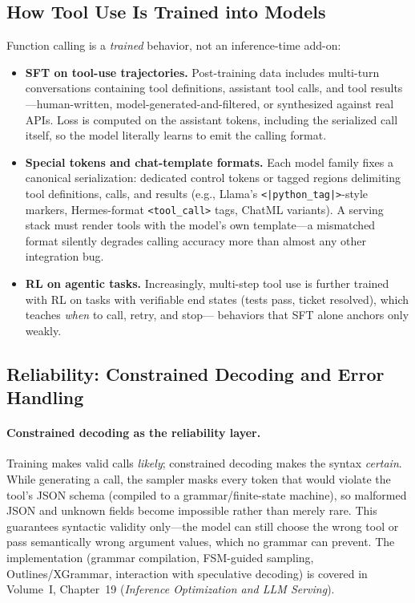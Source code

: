 \subsection{How Tool Use Is Trained into Models}

Function calling is a \emph{trained} behavior, not an inference-time
add-on:

\begin{itemize}[leftmargin=*]
\item \textbf{SFT on tool-use trajectories.}  Post-training data includes
  multi-turn conversations containing tool definitions, assistant tool
  calls, and tool results---human-written, model-generated-and-filtered, or
  synthesized against real APIs.  Loss is computed on the assistant tokens,
  including the serialized call itself, so the model literally learns to
  emit the calling format.
\item \textbf{Special tokens and chat-template formats.}  Each model family
  fixes a canonical serialization: dedicated control tokens or tagged
  regions delimiting tool definitions, calls, and results (e.g.,
  Llama's \texttt{<|python\_tag|>}-style markers, Hermes-format
  \texttt{<tool\_call>} tags, ChatML variants).  A serving stack must render
  tools with the model's own template---a mismatched format silently
  degrades calling accuracy more than almost any other integration bug.
\item \textbf{RL on agentic tasks.}  Increasingly, multi-step tool use is
  further trained with RL on tasks with verifiable end states (tests pass,
  ticket resolved), which teaches \emph{when} to call, retry, and stop---
  behaviors that SFT alone anchors only weakly.
\end{itemize}

\subsection{Reliability: Constrained Decoding and Error Handling}

\paragraph{Constrained decoding as the reliability layer.}
Training makes valid calls \emph{likely}; constrained decoding makes the
syntax \emph{certain}.  While generating a call, the sampler masks every
token that would violate the tool's JSON schema (compiled to a
grammar/finite-state machine), so malformed JSON and unknown fields become
impossible rather than merely rare.  This guarantees syntactic validity
only---the model can still choose the wrong tool or pass semantically wrong
argument values, which no grammar can prevent.  The implementation
(grammar compilation, FSM-guided sampling, Outlines/XGrammar, interaction
with speculative decoding) is covered in Volume~I, Chapter~19
(\emph{Inference Optimization and LLM Serving}).

